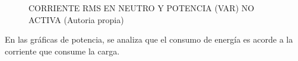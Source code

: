    \begin{figure}[H]
      \hfill
      \hfill
      \hfill
      \caption{CORRIENTE RMS EN NEUTRO Y POTENCIA (VAR) NO ACTIVA (Autoria propia)}
      \end{figure}

      En las gráficas de potencia, se analiza que el consumo de energía es acorde a la corriente que consume la carga.

  